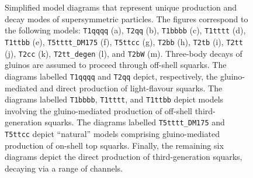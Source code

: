 \begin{figure}[!h]
\begin{center}
    ~~
    \\
    ~~
    ~~
   \caption{ Simplified model diagrams that represent unique
     production and decay modes of supersymmetric particles. The
     figures correspond to the following models: \texttt{T1qqqq} (a),
     \texttt{T2qq} (b), \texttt{T1bbbb} (c), \texttt{T1tttt} (d),
     \texttt{T1ttbb} (e), \texttt{T5tttt\_DM175} (f), \texttt{T5ttcc}
     (g), \texttt{T2bb} (h), \texttt{T2tb} (i), \texttt{T2tt} (j),
     \texttt{T2cc} (k), \texttt{T2tt\_degen} (l), and \texttt{T2bW}
     (m). Three-body decays of gluinos are assumed to proceed through
     off-shell squarks. The diagrams labelled \texttt{T1qqqq} and
     \texttt{T2qq} depict, respectively, the gluino-mediated and
     direct production of light-flavour squarks. The diagrams labelled
     \texttt{T1bbbb}, \texttt{T1tttt}, and \texttt{T1ttbb} depict
     models involving the gluino-mediated production of off-shell
     third-generation squarks. The diagrams labelled
     \texttt{T5tttt\_DM175} and \texttt{T5ttcc} depict ``natural''
     models comprising gluino-mediated production of on-shell top
     squarks. Finally, the remaining six diagrams depict the direct
     production of third-generation squarks, decaying via a range of
     channels.  }
   \label{fig:simplified-models}
 \end{center}
\end{figure}



